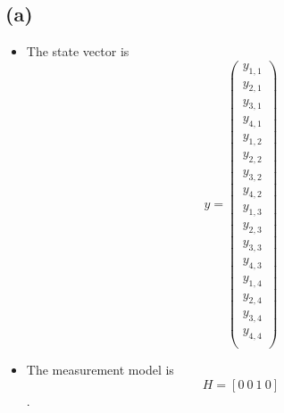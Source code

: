 \documentclass[letterpaper]{tufte-handout}
\begin{document}
\subsection{(a)}
\begin{itemize}
  \item The state vector is \[y =
      \begin{pmatrix} y_{1,1} \\ y_{2,1} \\ y_{3,1} \\ y_{4,1} \\
        y_{1,2} \\ y_{2,2} \\ y_{3,2} \\ y_{4,2} \\
        y_{1,3} \\ y_{2,3} \\ y_{3,3} \\ y_{4,3} \\
        y_{1,4} \\ y_{2,4} \\ y_{3,4} \\ y_{4,4} \\
    \end{pmatrix}\]
  \item The measurement model is \[H = [0\ 0\ 1\ 0]\].
\end{itemize}
\end{document}
